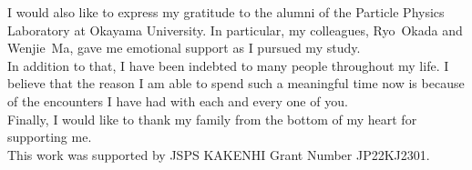 I would also like to express my gratitude to the alumni of the Particle Physics Laboratory at Okayama University.
In particular, my colleagues, Ryo~Okada and Wenjie~Ma, gave me emotional support as I pursued my study.\\
\hs
In addition to that, I have been indebted to many people throughout my life.
I believe that the reason I am able to spend such a meaningful time now is because of the encounters I have had with each and every one of you.\\
\hs
Finally, I would like to thank my family from the bottom of my heart for supporting me.\\
\hs
This work was supported by JSPS KAKENHI Grant Number JP22KJ2301.
\thispagestyle{empty}
